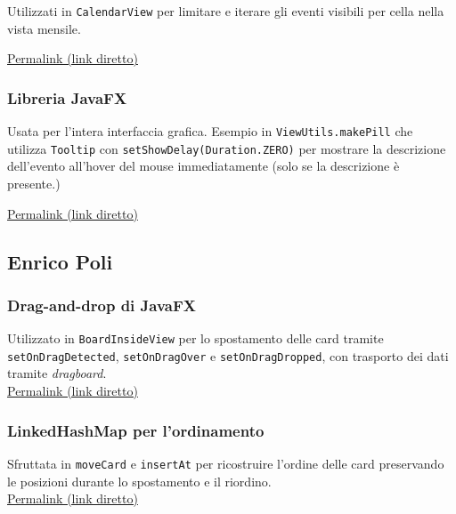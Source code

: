 \documentclass[a4paper,12pt]{report}
\begin{document}
Utilizzati in \texttt{CalendarView} per limitare e iterare gli eventi visibili per cella nella vista mensile.

\href{https://github.com/EnricoP0421/PSS25-Chronio/blob/34d1db0db9fd6cff156d6554a28cfc19982bf427/src/main/java/com/chronio/calendar/view/CalendarView.java#L208-L213}{Permalink (link diretto)}

\subsubsection{Libreria JavaFX}

Usata per l'intera interfaccia grafica. Esempio in \texttt{ViewUtils.makePill} che utilizza \texttt{Tooltip} con \texttt{setShowDelay(Duration.ZERO)} per mostrare la descrizione dell'evento all'hover del mouse immediatamente (solo se la descrizione è presente.)

\href{https://github.com/EnricoP0421/PSS25-Chronio/blob/34d1db0db9fd6cff156d6554a28cfc19982bf427/src/main/java/com/chronio/calendar/view/ViewUtils.java#L87-L90}{Permalink (link diretto)}

\subsection{Enrico Poli}

\subsubsection{Drag-and-drop di JavaFX}
Utilizzato in \texttt{BoardInsideView} per lo spostamento delle card tramite
\texttt{setOnDragDetected}, \texttt{setOnDragOver} e \texttt{setOnDragDropped},
con trasporto dei dati tramite \textit{dragboard}.\\
\href{https://github.com/EnricoP0421/PSS25-Chronio/blob/dev/src/main/java/com/chronio/kanban/view/BoardInsideView.java#L256-L283}{Permalink (link diretto)}
 
\subsubsection{LinkedHashMap per l'ordinamento}
Sfruttata in \texttt{moveCard} e \texttt{insertAt} per ricostruire l'ordine
delle card preservando le posizioni durante lo spostamento e il riordino.\\
\href{https://github.com/EnricoP0421/PSS25-Chronio/blob/dev/src/main/java/com/chronio/kanban/controller/BoardControllerImpl.java#L286-L301}{Permalink (link diretto)}
 
\end{document}
